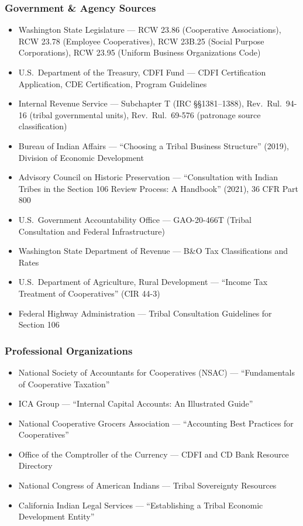 \documentclass[11pt,letterpaper]{article}
\begin{document}
\subsubsection{Government \& Agency Sources}
\begin{itemize}[leftmargin=2em]
  \item Washington State Legislature --- RCW 23.86 (Cooperative Associations), RCW 23.78 (Employee Cooperatives), RCW 23B.25 (Social Purpose Corporations), RCW 23.95 (Uniform Business Organizations Code)
  \item U.S.\ Department of the Treasury, CDFI Fund --- CDFI Certification Application, CDE Certification, Program Guidelines
  \item Internal Revenue Service --- Subchapter T (IRC \S\S 1381--1388), Rev.\ Rul.\ 94-16 (tribal governmental units), Rev.\ Rul.\ 69-576 (patronage source classification)
  \item Bureau of Indian Affairs --- ``Choosing a Tribal Business Structure'' (2019), Division of Economic Development
  \item Advisory Council on Historic Preservation --- ``Consultation with Indian Tribes in the Section 106 Review Process: A Handbook'' (2021), 36 CFR Part 800
  \item U.S.\ Government Accountability Office --- GAO-20-466T (Tribal Consultation and Federal Infrastructure)
  \item Washington State Department of Revenue --- B\&O Tax Classifications and Rates
  \item U.S.\ Department of Agriculture, Rural Development --- ``Income Tax Treatment of Cooperatives'' (CIR 44-3)
  \item Federal Highway Administration --- Tribal Consultation Guidelines for Section 106
\end{itemize}

\subsubsection{Professional Organizations}
\begin{itemize}[leftmargin=2em]
  \item National Society of Accountants for Cooperatives (NSAC) --- ``Fundamentals of Cooperative Taxation''
  \item ICA Group --- ``Internal Capital Accounts: An Illustrated Guide''
  \item National Cooperative Grocers Association --- ``Accounting Best Practices for Cooperatives''
  \item Office of the Comptroller of the Currency --- CDFI and CD Bank Resource Directory
  \item National Congress of American Indians --- Tribal Sovereignty Resources
  \item California Indian Legal Services --- ``Establishing a Tribal Economic Development Entity''
\end{itemize}
\end{document}
